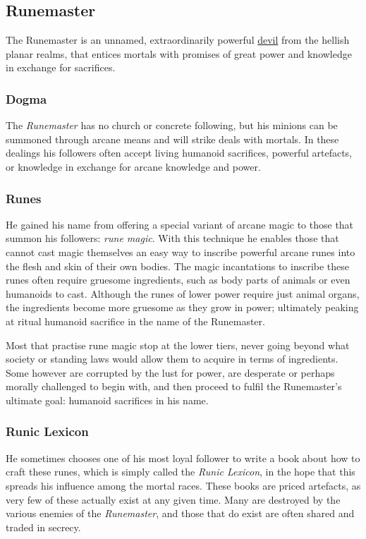 \subsection{Runemaster}
\label{sec:Runemaster}

The Runemaster is an unnamed, extraordinarily powerful
\hyperref[sec:Devils]{devil} from the hellish planar realms, that entices
mortals with promises of great power and knowledge in exchange for sacrifices.

\subsubsection{Dogma}

The \emph{Runemaster} has no church or concrete following, but his minions can
be summoned through arcane means and will strike deals with mortals. In these
dealings his followers often accept living humanoid sacrifices, powerful
artefacts, or knowledge in exchange for arcane knowledge and power.

\subsubsection{Runes}

He gained his name from offering a special variant of arcane magic to those
that summon his followers: \emph{rune magic}. With this technique he enables
those that cannot cast magic themselves an easy way to inscribe powerful
arcane runes into the flesh and skin of their own bodies. The magic
incantations to inscribe these runes often require gruesome ingredients, such
as body parts of animals or even humanoids to cast. Although the runes of
lower power require just animal organs, the ingredients become more gruesome as
they grow in power; ultimately peaking at ritual humanoid sacrifice in the
name of the Runemaster.

Most that practise rune magic stop at the lower tiers, never going beyond what
society or standing laws would allow them to acquire in terms of
ingredients. Some however are corrupted by the lust for power, are desperate
or perhaps morally challenged to begin with, and then proceed to fulfil the
Runemaster's ultimate goal: humanoid sacrifices in his name.

\subsubsection{Runic Lexicon}

He sometimes chooses one of his most loyal follower to write a book about how
to craft these runes, which is simply called the \emph{Runic Lexicon}, in the
hope that this spreads his influence among the mortal races. These books are
priced artefacts, as very few of these actually exist at any given time. Many
are destroyed by the various enemies of the \emph{Runemaster}, and those that
do exist are often shared and traded in secrecy.

